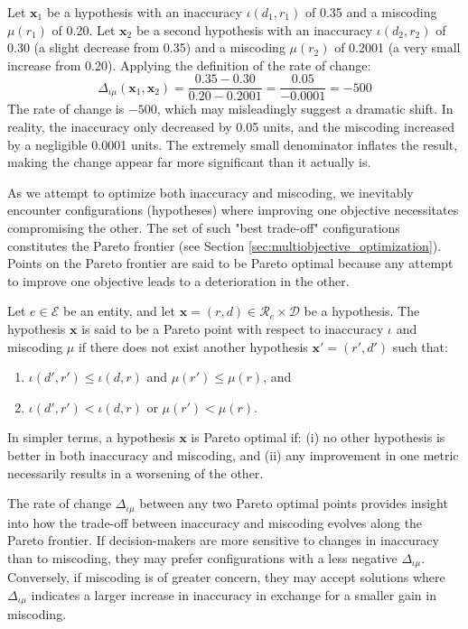 \begin{example}
Let $\mathbf{x}_1$ be a hypothesis with an inaccuracy $\iota(d_1, r_1)$ of 0.35 and a miscoding $\mu(r_1)$ of 0.20. Let $\mathbf{x}_2$ be a second hypothesis with an inaccuracy $\iota(d_2, r_2)$ of 0.30 (a slight decrease from 0.35) and a miscoding $\mu(r_2)$ of 0.2001 (a very small increase from 0.20). Applying the definition of the rate of change:
\[
\Delta_{\iota \mu} ( \mathbf{x}_1, \mathbf{x}_2 ) = \frac{0.35 - 0.30}{0.20 - 0.2001} = \frac{0.05}{-0.0001} = -500
\]
The rate of change is $-500$, which may misleadingly suggest a dramatic shift. In reality, the inaccuracy only decreased by 0.05 units, and the miscoding increased by a negligible 0.0001 units. The extremely small denominator inflates the result, making the change appear far more significant than it actually is.
\end{example}

As we attempt to optimize both inaccuracy and miscoding, we inevitably encounter configurations (hypotheses) where improving one objective necessitates compromising the other. The set of such "best trade-off" configurations constitutes the Pareto frontier (see Section \ref{sec:multiobjective_optimization}). Points on the Pareto frontier are said to be Pareto optimal because any attempt to improve one objective leads to a deterioration in the other.

\begin{definition}
Let \( e \in \mathcal{E} \) be an entity, and let \( \mathbf{x} = (r, d) \in \mathcal{R}_e \times \mathcal{D} \) be a hypothesis. The hypothesis \( \mathbf{x} \) is said to be a Pareto point with respect to inaccuracy \( \iota \) and miscoding \( \mu \) if there does not exist another hypothesis \( \mathbf{x'} = (r', d') \) such that:
\begin{enumerate}
    \item \( \iota(d', r') \leq \iota(d, r) \) and \( \mu(r') \leq \mu(r) \), and
    \item \( \iota(d', r') < \iota(d, r) \) or \( \mu(r') < \mu(r) \).
\end{enumerate}
\end{definition}

In simpler terms, a hypothesis $\mathbf{x}$ is Pareto optimal if: (i) no other hypothesis is better in both inaccuracy and miscoding, and (ii) any improvement in one metric necessarily results in a worsening of the other.

The rate of change $\Delta_{\iota \mu}$ between any two Pareto optimal points provides insight into how the trade-off between inaccuracy and miscoding evolves along the Pareto frontier. If decision-makers are more sensitive to changes in inaccuracy than to miscoding, they may prefer configurations with a less negative $\Delta_{\iota \mu}$. Conversely, if miscoding is of greater concern, they may accept solutions where $\Delta_{\iota \mu}$ indicates a larger increase in inaccuracy in exchange for a smaller gain in miscoding.

